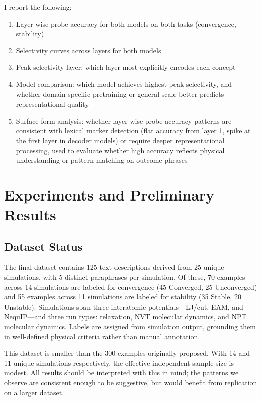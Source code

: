 \documentclass[11pt]{article}
\begin{document}
I report the following:

\begin{enumerate}
    \item Layer-wise probe accuracy for both models on both tasks (convergence, stability)
    \item Selectivity curves across layers for both models
    \item Peak selectivity layer; which layer most explicitly encodes each concept
    \item Model comparison: which model achieves highest peak selectivity, and whether domain-specific pretraining or general scale better predicts representational quality
    \item Surface-form analysis: whether layer-wise probe accuracy patterns are consistent with lexical marker detection (flat accuracy from layer 1, spike at the first layer in decoder models) or require deeper representational processing, used to evaluate whether high accuracy reflects physical understanding or pattern matching on outcome phrases
\end{enumerate}

\section{Experiments and Preliminary Results}

\subsection{Dataset Status}

The final dataset contains 125 text descriptions derived from 25 unique simulations, with 5 distinct paraphrases per simulation. Of these, 70 examples across 14 simulations are labeled for convergence (45 Converged, 25 Unconverged) and 55 examples across 11 simulations are labeled for stability (35 Stable, 20 Unstable). Simulations span three interatomic potentials---LJ/cut, EAM, and NequIP---and three run types: relaxation, NVT molecular dynamics, and NPT molecular dynamics. Labels are assigned from simulation output, grounding them in well-defined physical criteria rather than manual annotation.

This dataset is smaller than the 300 examples originally proposed. With 14 and 11 unique simulations respectively, the effective independent sample size is modest. All results should be interpreted with this in mind; the patterns we observe are consistent enough to be suggestive, but would benefit from replication on a larger dataset.
\end{document}
